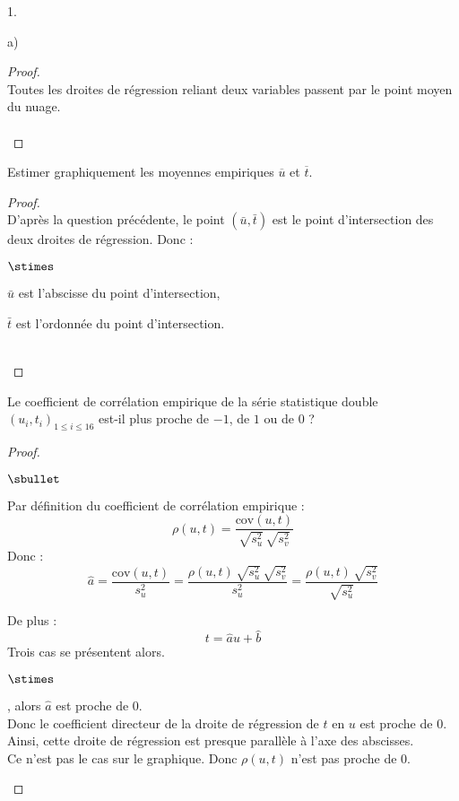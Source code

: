 \documentclass[11pt]{article}%
\begin{document}
\begin{noliste}{1.}
\begin{noliste}{a)}
  \begin{proof}~\\
   Toutes les droites de régression reliant deux variables passent
   par le point moyen du nuage.~\\[-.8cm]
   ~\\[-1cm]
  \end{proof}

  
  \item Estimer graphiquement les moyennes empiriques $\overline{u}$ et 
  $\overline{t}$.
  
  \begin{proof}~\\
   D'après la question précédente, le point $(\bar{u}, \bar{t})$ 
   est le point d'intersection des deux droites de régression. Donc :
   \begin{noliste}{$\stimes$}
    \item $\bar{u}$ est l'abscisse du point d'intersection,
    \item $\bar{t}$ est l'ordonnée du point d'intersection.
   \end{noliste}
   ~\\[-1cm]
  \end{proof}
  
  \item Le coefficient de corrélation empirique de la série statistique 
  double $(u_i,t_i)_{1 \leq i \leq 16}$ est-il plus 
  proche de $-1$, de $1$ ou de $0$ ?
  
  \begin{proof}~
   \begin{noliste}{$\sbullet$}
    \item Par définition du coefficient de corrélation empirique :
    \[
     \rho(u,t) = \dfrac{\text{cov}(u,t)}{\sqrt{s_u^2} \, \sqrt{s_v^2}}
    \]
    Donc :
    \[
     \hat{a} = \dfrac{\text{cov}(u,t)}{s_u^2} = 
     \dfrac{\rho(u,t) \, \sqrt{s_u^2} \, \sqrt{s_v^2}}{s_u^2} = 
     \dfrac{\rho(u,t) \, \sqrt{s_v^2}}{\sqrt{s_u^2}}
    \]
   
    \item De plus :
    \[
     t = \hat{a} u + \hat{b}
    \]
    Trois cas se présentent alors.
    \begin{noliste}{$\stimes$}
      \item {}, alors
      $\hat{a}$ est proche de $0$.\\[.1cm]
      Donc le coefficient directeur de la droite de régression de $t$ 
      en $u$ est proche de $0$.\\
      Ainsi, cette droite de régression est presque parallèle à 
      l'axe des abscisses.\\
      Ce n'est pas le cas sur le graphique. Donc $\rho(u,t)$ 
      n'est pas proche de $0$.
      

\end{noliste}
\end{noliste}
\end{proof}
\end{noliste}
\end{noliste}
\end{document}
